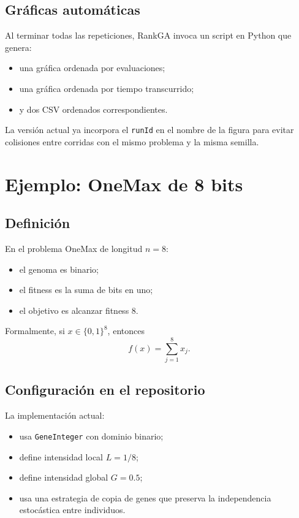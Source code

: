 \documentclass[11pt]{article}
\begin{document}
\subsection{Gr\'aficas autom\'aticas}

Al terminar todas las repeticiones, RankGA invoca un script en Python que
genera:

\begin{itemize}
  \item una gr\'afica ordenada por evaluaciones;
  \item una gr\'afica ordenada por tiempo transcurrido;
  \item y dos CSV ordenados correspondientes.
\end{itemize}

La versi\'on actual ya incorpora el \texttt{runId} en el nombre de la figura
para evitar colisiones entre corridas con el mismo problema y la misma semilla.

\section{Ejemplo: OneMax de 8 bits}

\subsection{Definici\'on}

En el problema OneMax de longitud \(n=8\):

\begin{itemize}
  \item el genoma es binario;
  \item el fitness es la suma de bits en uno;
  \item el objetivo es alcanzar fitness \(8\).
\end{itemize}

Formalmente, si \(x \in \{0,1\}^8\), entonces
\[
f(x) = \sum_{j=1}^{8} x_j.
\]

\subsection{Configuraci\'on en el repositorio}

La implementaci\'on actual:

\begin{itemize}
  \item usa \texttt{GeneInteger} con dominio binario;
  \item define intensidad local \(L = 1/8\);
  \item define intensidad global \(G = 0.5\);
  \item usa una estrategia de copia de genes que preserva la independencia
  estoc\'astica entre individuos.
\end{itemize}
\end{document}
